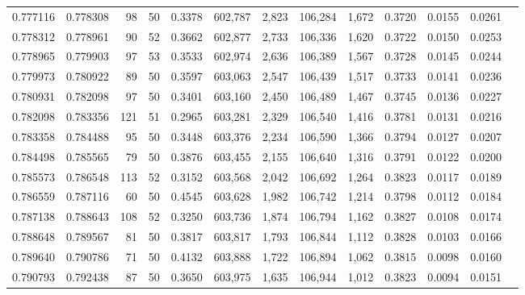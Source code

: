 \begin{tabular}{rrrrrrrrrrrrr}
0.777116 & 0.778308 &    98 &  50 &                                     0.3378 & 602,787 &   2,823 & 106,284 &   1,672 & 0.3720 & 0.0155 & 0.0261 \\
0.778312 & 0.778961 &    90 &  52 &                                     0.3662 & 602,877 &   2,733 & 106,336 &   1,620 & 0.3722 & 0.0150 & 0.0253 \\
0.778965 & 0.779903 &    97 &  53 &                                     0.3533 & 602,974 &   2,636 & 106,389 &   1,567 & 0.3728 & 0.0145 & 0.0244 \\
0.779973 & 0.780922 &    89 &  50 &                                     0.3597 & 603,063 &   2,547 & 106,439 &   1,517 & 0.3733 & 0.0141 & 0.0236 \\
0.780931 & 0.782098 &    97 &  50 &                                     0.3401 & 603,160 &   2,450 & 106,489 &   1,467 & 0.3745 & 0.0136 & 0.0227 \\
0.782098 & 0.783356 &   121 &  51 &                                     0.2965 & 603,281 &   2,329 & 106,540 &   1,416 & 0.3781 & 0.0131 & 0.0216 \\
0.783358 & 0.784488 &    95 &  50 &                                     0.3448 & 603,376 &   2,234 & 106,590 &   1,366 & 0.3794 & 0.0127 & 0.0207 \\
0.784498 & 0.785565 &    79 &  50 &                                     0.3876 & 603,455 &   2,155 & 106,640 &   1,316 & 0.3791 & 0.0122 & 0.0200 \\
0.785573 & 0.786548 &   113 &  52 &                                     0.3152 & 603,568 &   2,042 & 106,692 &   1,264 & 0.3823 & 0.0117 & 0.0189 \\
0.786559 & 0.787116 &    60 &  50 &                                     0.4545 & 603,628 &   1,982 & 106,742 &   1,214 & 0.3798 & 0.0112 & 0.0184 \\
0.787138 & 0.788643 &   108 &  52 &                                     0.3250 & 603,736 &   1,874 & 106,794 &   1,162 & 0.3827 & 0.0108 & 0.0174 \\
0.788648 & 0.789567 &    81 &  50 &                                     0.3817 & 603,817 &   1,793 & 106,844 &   1,112 & 0.3828 & 0.0103 & 0.0166 \\
0.789640 & 0.790786 &    71 &  50 &                                     0.4132 & 603,888 &   1,722 & 106,894 &   1,062 & 0.3815 & 0.0098 & 0.0160 \\
0.790793 & 0.792438 &    87 &  50 &                                     0.3650 & 603,975 &   1,635 & 106,944 &   1,012 & 0.3823 & 0.0094 & 0.0151 \\

\end{tabular}
